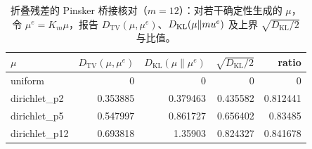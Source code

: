 \begin{table}[H]
\centering
\scriptsize
\setlength{\tabcolsep}{4pt}
\caption{折叠残差的 Pinsker 桥接核对（$m=12$）：对若干确定性生成的 $\mu$，令 $\mu^e=K_m\mu$，报告 $D_{\mathrm{TV}}(\mu,\mu^e)$、$D_{\mathrm{KL}}(\mu\|\\mu^e)$ 及上界 $\sqrt{D_{\mathrm{KL}}/2}$ 与比值。}
\label{tab:fold_pinsker_residual_bridge}
\begin{tabular}{lrrrr}
\toprule
$\mu$ & $D_{\mathrm{TV}}(\mu,\mu^e)$ & $D_{\mathrm{KL}}(\mu\|\mu^e)$ & $\sqrt{D_{\mathrm{KL}}/2}$ & ratio\\
\midrule
uniform & 0 & 0 & 0 & 0\\
dirichlet\_p2 & 0.353885 & 0.379463 & 0.435582 & 0.812441\\
dirichlet\_p5 & 0.547997 & 0.861727 & 0.656402 & 0.83485\\
dirichlet\_p12 & 0.693818 & 1.35903 & 0.824327 & 0.841678\\
\bottomrule
\end{tabular}
\end{table}
